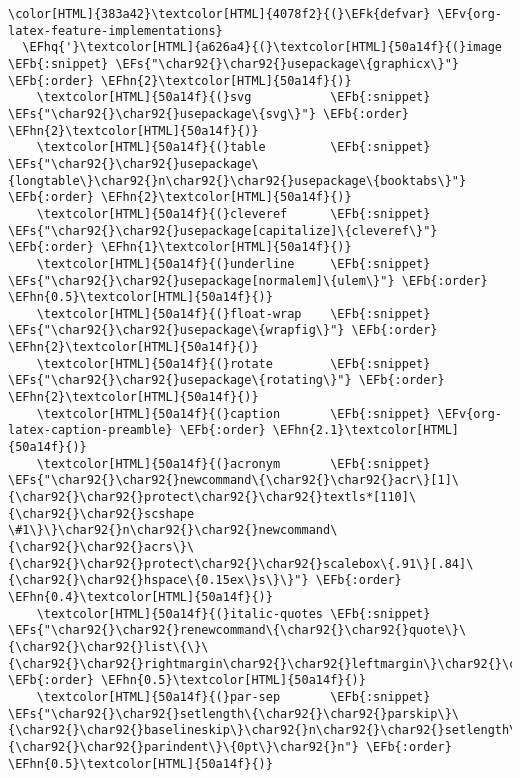 \documentclass{scrartcl}
\newcommand{\EFk}[1]{\textcolor{EFk}{#1}} %
\newcommand{\EFs}[1]{\textcolor{EFs}{#1}} %
\newcommand{\EFb}[1]{\textcolor{EFb}{#1}} %
\newcommand{\EFv}[1]{\textcolor{EFv}{#1}} %
\newcommand{\EFhn}[1]{\textcolor{EFhn}{\textbf{#1}}} %
\newcommand{\EFhq}[1]{\textcolor{EFhq}{#1}} %
\begin{document}
\begin{enumerate}
\begin{Code}
\begin{Verbatim}[]
\color[HTML]{383a42}\textcolor[HTML]{4078f2}{(}\EFk{defvar} \EFv{org-latex-feature-implementations}
  \EFhq{'}\textcolor[HTML]{a626a4}{(}\textcolor[HTML]{50a14f}{(}image         \EFb{:snippet} \EFs{"\char92{}\char92{}usepackage\{graphicx\}"} \EFb{:order} \EFhn{2}\textcolor[HTML]{50a14f}{)}
    \textcolor[HTML]{50a14f}{(}svg           \EFb{:snippet} \EFs{"\char92{}\char92{}usepackage\{svg\}"} \EFb{:order} \EFhn{2}\textcolor[HTML]{50a14f}{)}
    \textcolor[HTML]{50a14f}{(}table         \EFb{:snippet} \EFs{"\char92{}\char92{}usepackage\{longtable\}\char92{}n\char92{}\char92{}usepackage\{booktabs\}"} \EFb{:order} \EFhn{2}\textcolor[HTML]{50a14f}{)}
    \textcolor[HTML]{50a14f}{(}cleveref      \EFb{:snippet} \EFs{"\char92{}\char92{}usepackage[capitalize]\{cleveref\}"} \EFb{:order} \EFhn{1}\textcolor[HTML]{50a14f}{)}
    \textcolor[HTML]{50a14f}{(}underline     \EFb{:snippet} \EFs{"\char92{}\char92{}usepackage[normalem]\{ulem\}"} \EFb{:order} \EFhn{0.5}\textcolor[HTML]{50a14f}{)}
    \textcolor[HTML]{50a14f}{(}float-wrap    \EFb{:snippet} \EFs{"\char92{}\char92{}usepackage\{wrapfig\}"} \EFb{:order} \EFhn{2}\textcolor[HTML]{50a14f}{)}
    \textcolor[HTML]{50a14f}{(}rotate        \EFb{:snippet} \EFs{"\char92{}\char92{}usepackage\{rotating\}"} \EFb{:order} \EFhn{2}\textcolor[HTML]{50a14f}{)}
    \textcolor[HTML]{50a14f}{(}caption       \EFb{:snippet} \EFv{org-latex-caption-preamble} \EFb{:order} \EFhn{2.1}\textcolor[HTML]{50a14f}{)}
    \textcolor[HTML]{50a14f}{(}acronym       \EFb{:snippet} \EFs{"\char92{}\char92{}newcommand\{\char92{}\char92{}acr\}[1]\{\char92{}\char92{}protect\char92{}\char92{}textls*[110]\{\char92{}\char92{}scshape \#1\}\}\char92{}n\char92{}\char92{}newcommand\{\char92{}\char92{}acrs\}\{\char92{}\char92{}protect\char92{}\char92{}scalebox\{.91\}[.84]\{\char92{}\char92{}hspace\{0.15ex\}s\}\}"} \EFb{:order} \EFhn{0.4}\textcolor[HTML]{50a14f}{)}
    \textcolor[HTML]{50a14f}{(}italic-quotes \EFb{:snippet} \EFs{"\char92{}\char92{}renewcommand\{\char92{}\char92{}quote\}\{\char92{}\char92{}list\{\}\{\char92{}\char92{}rightmargin\char92{}\char92{}leftmargin\}\char92{}\char92{}item\char92{}\char92{}relax\char92{}\char92{}em\}\char92{}n"} \EFb{:order} \EFhn{0.5}\textcolor[HTML]{50a14f}{)}
    \textcolor[HTML]{50a14f}{(}par-sep       \EFb{:snippet} \EFs{"\char92{}\char92{}setlength\{\char92{}\char92{}parskip\}\{\char92{}\char92{}baselineskip\}\char92{}n\char92{}\char92{}setlength\{\char92{}\char92{}parindent\}\{0pt\}\char92{}n"} \EFb{:order} \EFhn{0.5}\textcolor[HTML]{50a14f}{)}

\end{Verbatim}
\end{Code}
\end{enumerate}
\end{document}
